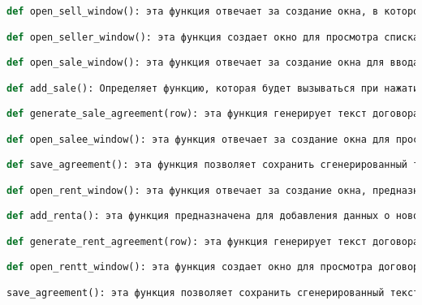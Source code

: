 \begin{lstlisting}[language=Python]
def open_sell_window(): эта функция отвечает за создание окна, в котором пользователь может ввести данные о новом владельце (продавце/арендодателе) недвижимости.

def open_seller_window(): эта функция создает окно для просмотра списка владельцев (продавцов/арендодателей) недвижимости, извлекая данные из базы данных и отображая их в виде списка.

def open_sale_window(): эта функция отвечает за создание окна для ввода данных о новой продаже (заключении договора купли-продажи) и добавления этой информации в базу данных.

def add_sale(): Определяет функцию, которая будет вызываться при нажатии кнопки «Добавить». Эта функция собирает данные из полей ввода, проверяет их и добавляет новую запись в таблицу sale в базе данных.

def generate_sale_agreement(row): эта функция генерирует текст договора купли-продажи на основе данных, полученных из базы данных. Она принимает строку данных (row) в качестве аргумента и формирует текстовое представление договора, готовое к отображению или печати.

def open_salee_window(): эта функция отвечает за создание окна для просмотра информации о существующих договорах купли-продажи. Она извлекает данные о продажах из базы данных, отображает их в виде списка и предоставляет возможность сгенерировать текст договора для выбранной продажи.

def save_agreement(): эта функция позволяет сохранить сгенерированный текст договора (хранящийся в переменной agreement) в текстовый файл, выбранный пользователем с помощью диалогового окна сохранения файла.

def open_rent_window(): эта функция отвечает за создание окна, предназначенного для ввода информации о договоре аренды. 

def add_renta(): эта функция предназначена для добавления данных о новом договоре аренды в базу данных. Она собирает информацию из полей ввода в графическом интерфейсе, а затем вставляет эту информацию в таблицу renta. Также добавляет сообщение об успешном выполнении и закрывает окно.

def generate_rent_agreement(row): эта функция генерирует текст договора аренды на основе данных, полученных из строки базы данных. Функция формирует текст договора, который можно отобразить пользователю или сохранить в файл.

def open_rentt_window(): эта функция создает окно для просмотра договоров аренды. Она извлекает данные из базы данных и отображает их в виджете Listbox. Также предоставляет возможность сгенерировать договор аренды на основе выбранной записи.

save_agreement(): эта функция позволяет сохранить сгенерированный текст договора аренды (который хранится в переменной agreement) в текстовом файле. Пользователь может выбрать место и имя файла с помощью стандартного диалогового окна сохранения файла.
\end{lstlisting}  

